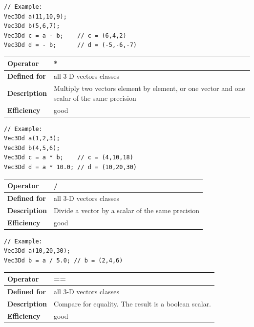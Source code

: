 \documentclass[11pt,a4paper,oneside,openright]{report}
\newcommand{\vspacesmall}{\vspace{3mm}}
\newcommand{\vspacebig}{\vspace{6mm}}
\begin{document}
\begin{lstlisting}[frame=none]
// Example:
Vec3Dd a(11,10,9);
Vec3Dd b(5,6,7);
Vec3Dd c = a - b;    // c = (6,4,2)
Vec3Dd d = - b;      // d = (-5,-6,-7)
\end{lstlisting}
\vspacebig


\begin{tabular}{|p{25mm}|p{100mm}|}
\hline
\bfseries Operator & * \\ \hline
\bfseries Defined for & all 3-D vectors classes  \\ \hline
\bfseries Description & Multiply two vectors element by element, or one vector and one scalar of the same precision \\ \hline
\bfseries Efficiency & good \\ \hline
\end{tabular}
\vspacesmall

\begin{lstlisting}[frame=none]
// Example:
Vec3Dd a(1,2,3);
Vec3Dd b(4,5,6);
Vec3Dd c = a * b;    // c = (4,10,18)
Vec3Dd d = a * 10.0; // d = (10,20,30)
\end{lstlisting}
\vspacebig


\begin{tabular}{|p{25mm}|p{100mm}|}
\hline
\bfseries Operator & / \\ \hline
\bfseries Defined for & all 3-D vectors classes  \\ \hline
\bfseries Description & Divide a vector by a scalar of the same precision \\ \hline
\bfseries Efficiency & good \\ \hline
\end{tabular}
\vspacesmall

\begin{lstlisting}[frame=none]
// Example:
Vec3Dd a(10,20,30);
Vec3Dd b = a / 5.0; // b = (2,4,6)
\end{lstlisting}
\vspacebig


\begin{tabular}{|p{25mm}|p{100mm}|}
\hline
\bfseries Operator & == \\ \hline
\bfseries Defined for & all 3-D vectors classes  \\ \hline
\bfseries Description & Compare for equality.\newline
The result is a boolean scalar. \\ \hline
\bfseries Efficiency & good \\ \hline
\end{tabular}
\vspacesmall
\end{document}
